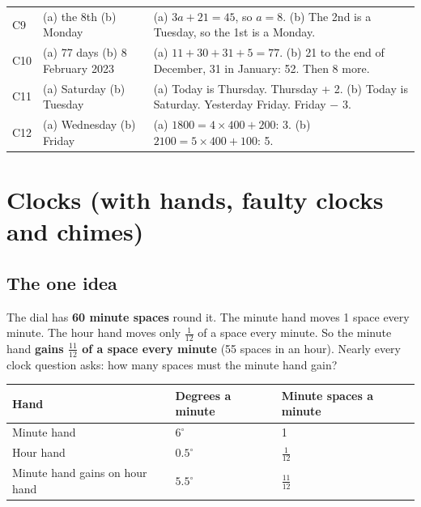 \documentclass[11pt,a4paper]{article}
\let\oldsubsection\subsection
\renewcommand{\subsection}{\needspace{9\baselineskip}\oldsubsection}
\begin{document}
\begin{center}
\begin{tabularx}{\linewidth}{@{}l>{\raggedright\arraybackslash}p{3.4cm}>{\raggedright\arraybackslash}X@{}}
C9 & (a) the 8th \newline (b) Monday & (a) $3a + 21 = 45$, so $a = 8$. \newline (b) The 2nd is a Tuesday, so the 1st is a Monday. \\
C10 & (a) 77 days \newline (b) 8 February 2023 & (a) $11 + 30 + 31 + 5 = 77$. \newline (b) 21 to the end of December, 31 in January: 52. Then 8 more. \\
C11 & (a) Saturday \newline (b) Tuesday & (a) Today is Thursday. Thursday + 2. \newline (b) Today is Saturday. Yesterday Friday. Friday $-$ 3. \\
C12 & (a) Wednesday \newline (b) Friday & (a) $1800 = 4 \times 400 + 200$: 3. \newline (b) $2100 = 5 \times 400 + 100$: 5. \\
\bottomrule
\end{tabularx}\end{center}

\clearpage
\section[Clocks (K1--K12)]{Clocks (with hands, faulty clocks and chimes)}\label{ch:K}

\subsection*{The one idea}
The dial has \textbf{60 minute spaces} round it. The minute hand moves 1 space every minute. The hour hand moves only $\tfrac1{12}$ of a space every minute. So the minute hand \textbf{gains $\tfrac{11}{12}$ of a space every minute} (55 spaces in an hour). Nearly every clock question asks: how many spaces must the minute hand gain?

\begin{center}\small\renewcommand{\arraystretch}{1.18}\setlength{\tabcolsep}{9pt}
\begin{tabular}{@{}lll@{}}
\toprule
\textbf{\color{slate}Hand} & \textbf{\color{slate}Degrees a minute} & \textbf{\color{slate}Minute spaces a minute} \\ \midrule
Minute hand & $6^\circ$ & 1 \\
Hour hand & $0.5^\circ$ & $\tfrac1{12}$ \\
Minute hand gains on hour hand & $5.5^\circ$ & $\tfrac{11}{12}$ \\
\bottomrule
\end{tabular}\end{center}
\end{document}
